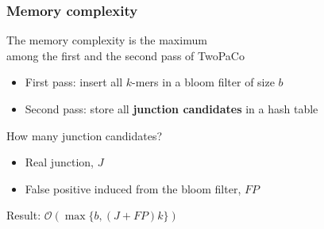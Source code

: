 \begin{frame}
  
	\frametitle{Memory complexity}

  \centering
	
	The memory complexity is the maximum \\ among the first and the second pass of TwoPaCo \\
	
	\medskip
	
	\begin{itemize}
	  \item First pass: insert all $k$-mers in a bloom filter of size $b$
	  \item Second pass: store all \textbf{junction candidates} in a hash table
	\end{itemize}
	
	\medskip
	
	How many junction candidates?
	
	\begin{itemize}
	  \item Real junction, $J$
	  \item False positive induced from the bloom filter, $FP$
	\end{itemize}

	\medskip
	
	Result: $\mathcal{O}(\max\{b, (J+FP)k\})$
	
	
\end{frame}


